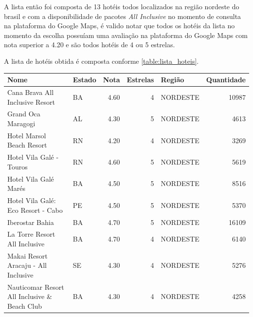 A lista então foi composta de 13 hotéis todos localizados na região nordeste do brasil e com a disponibilidade de pacotes \emph{All Inclusive} no momento de consulta na plataforma do Google Maps, é valido notar que todos os hotéis da lista no momento da escolha possuíam uma avaliação na plataforma do Google Maps com nota superior a 4.20 e são todos hotéis de 4 ou 5 estrelas.

A lista de hotéis obtida é composta conforme \ref{table:lista_hoteis}.

\begin{table}[]
	\begin{tabular}{|p{5cm}|l|r|r|l|r|}
		\hline
		\textbf{Nome}                                 & \textbf{Estado} & \textbf{Nota} & \textbf{Estrelas} & \textbf{Região} & \textbf{Quantidade} \\\hline
		Cana Brava All Inclusive Resort               & BA              & 4.60          & 4                 & NORDESTE        & 10987               \\\hline
		Grand Oca Maragogi                            & AL              & 4.30          & 5                 & NORDESTE        & 4613                \\\hline
		Hotel Marsol Beach Resort                     & RN              & 4.20          & 4                 & NORDESTE        & 3269                \\\hline
		Hotel Vila Galé - Touros                      & RN              & 4.60          & 5                 & NORDESTE        & 5619                \\\hline
		Hotel Vila Galé Marés                         & BA              & 4.50          & 5                 & NORDESTE        & 8516                \\\hline
		Hotel Vila Galé: Eco Resort - Cabo            & PE              & 4.50          & 5                 & NORDESTE        & 5370                \\\hline
		Iberostar Bahia                               & BA              & 4.70          & 5                 & NORDESTE        & 16109               \\\hline
		La Torre Resort All Inclusive                 & BA              & 4.70          & 4                 & NORDESTE        & 6140                \\\hline
		Makai Resort Aracaju - All Inclusive          & SE              & 4.30          & 4                 & NORDESTE        & 5276                \\\hline
		Nauticomar Resort All Inclusive \& Beach Club & BA              & 4.30          & 4                 & NORDESTE        & 4258                \\\hline

\end{tabular}
\end{table}

